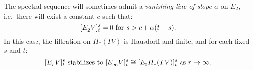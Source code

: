 \documentclass[11pt]{amsart} \renewcommand{\baselinestretch}{1.2}
\theoremstyle{plain}
\numberwithin{equation}{section} %
\theoremstyle{plain}
\numberwithin{equation}{chapter} %
\DeclareMathOperator{\Tot}{Tot}
\renewcommand{\to}{\longrightarrow}
\newcommand{\calT}{\mathcal{T}}
\newcommand{\calV}{\mathcal{V}}
\newcommand{\vect}[2]{\calV^{#1}_{#2}}
\newcommand{\Edownup}[5]{[E_{#1}^{#2}#3]^{#4}_{#5}}
\newcommand{\dhor}{_\mathrm{h}}
\begin{document}
\begin{Conventions and notation}
The spectral sequence will sometimes admit a \emph{vanishing line of slope $\alpha$} on $E_2$, i.e.\ there will exist a constant $c$ such that:
\[\Edownup{2}{}{V}{s}{t}=0\textup{ for }s>c+\alpha(t-s).\]
In this case, the filtration on $H_*( TV)$ is Hausdorff and finite, and  for each fixed $s$ and $t$:
\[\Edownup{r}{}{V}{s}{t}\textup{ stabilizes to }\Edownup{\infty}{}{V}{s}{t}\cong \Edownup{0}{}{H_*( TV)}{s}{t}\textup{ as $r\rightarrow\infty$}.\]
%



\end{Conventions and notation}
\end{document}
